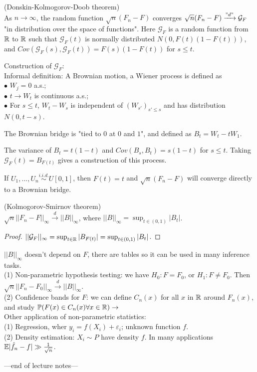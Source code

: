 \documentclass[a4paper]{article}
\begin{document}
\begin{thm} (Donskin-Kolmogorov-Doob theorem)\\
As $n \to \infty$, the random function $\sqrt{n}(F_n-F)$ converges $\sqrt{n} (F_n-F) \xrightarrow{"d"} \mathcal{G}_F$ "in distribution over the space of functions". Here $\mathcal{G}_F$ is a random function from $\mathbb{R}$ to $\mathbb{R}$ such that $\mathcal{G}_F(t)$ is normally distributed $N(0,F(t)(1-F(t)))$, and $Cov(\mathcal{G}_F(s), \mathcal{G}_F(t)) = F(s) (1-F(t))$ for $s \leq t$.

Construction of $\mathcal{G}_F$:\\
Informal definition: A Brownian motion, a Wiener process is defined as\\
$\bullet$ $W_j = 0$ a.s.;\\
$\bullet$ $t \to W_t $ is continuous a.s.;\\
$\bullet$ For $s \leq t$, $W_t - W_s$ is independent of $(W_{s'})_{s' \leq s}$ and has distribution $N(0,t-s)$.

The Brownian bridge is "tied to $0$ at $0$ and $1$", and defined as $B_t = W_t - tW_1$.

The variance of $B_t=t(1-t)$ and $Cov(B_s,B_t) = s(1-t)$ for $s \leq t$. Taking $\mathcal{G}_F (t) = B_{F(t)}$ gives a construction of this process.

\begin{rem}
If $U_1,...,U_n \stackrel{i.i.d.}{\sim} U[0,1]$, then $F(t) = t$ and $\sqrt{n}(F_n-F)$ will converge directly to a Brownian bridge.
\end{rem}
\end{thm}

\begin{thm} (Kolmogorov-Smirnov theorem)\\
$\sqrt{n} ||F_n - F||_\infty \xrightarrow{d} ||B||_\infty$, where $||B||_\infty = \sup_{t \in (0,1)} |B_t|$.
\begin{proof}
$||\mathcal{G}_F||_\infty = \sup_{t \in \mathbb{R}} |B_{F(t)}| = \sup_{t \in (0,1)} |B_t|$.
\end{proof}
\end{thm}

\begin{rem}
$||B||_\infty$ doesn't depend on $F$, there are tables so it can be used in many inference tasks.\\
(1) Non-parametric hypothesis testing: we have $H_0:F = F_0$, or $H_1: F \neq F_0$. Then $\sqrt{n} ||F_n - F_0||_\infty \xrightarrow{d} ||B||_\infty$.\\
(2) Confidence bands for $F$: we can define $C_n(x)$ for all $x$ in $\mathbb{R}$ around $F_n(x)$, and study $\mathbb{P}(F(x) \in C_n(x) \forall x \in \mathbb{R}) \to $\\
Other application of non-parametric statistics:\\
(1) Regression, wher $y_i = f(X_i) + \varepsilon_i$; unknown function $f$.\\
(2) Density estimation: $X_i \sim P$ have density $f$. In many applications $\mathbb{E}|\hat{f}_n - f| \gg \frac{1}{\sqrt{n}}$.
\end{rem}

---end of lecture notes---
\end{document}
